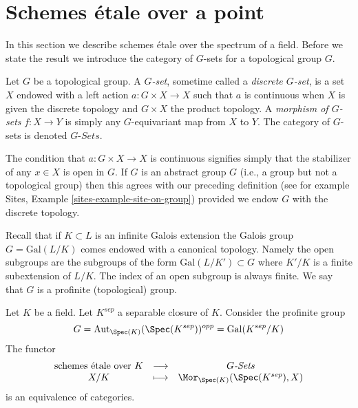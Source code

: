 \section{Schemes \'etale over a point}
\label{section-schemes-etale-point}

\noindent
In this section we describe schemes \'etale over the spectrum of
a field. Before we state the result we introduce
the category of $G$-sets for a topological group $G$.

\begin{definition}
\label{definition-G-set-continuous}
Let $G$ be a topological group.
A {\it $G$-set}, sometime called a {\it discrete $G$-set},
is a set $X$ endowed with a left action $a : G \times X \to X$
such that $a$ is continuous when $X$ is given the discrete topology and
$G \times X$ the product topology.
A {\it morphism of $G$-sets} $f : X \to Y$ is simply any $G$-equivariant
map from $X$ to $Y$.
The category of $G$-sets is denoted {\it $G\textit{-Sets}$}.
\end{definition}

\noindent
The condition that $a : G \times X \to X$ is continuous signifies
simply that the stabilizer of any  $x \in X$ is open in $G$.
If $G$ is an abstract group $G$ (i.e., a group but not a topological group)
then this agrees with our preceding definition (see for example
Sites, Example \ref{sites-example-site-on-group})
provided we endow $G$ with the discrete topology.

\medskip\noindent
Recall that if $K \subset L$ is an infinite Galois extension the
Galois group $G = \text{Gal}(L/K)$ comes endowed with a canonical
topology. Namely the open subgroups are the subgroups of the form
$\text{Gal}(L/K') \subset G$ where $K'/K$ is a finite subextension of $L/K$.
The index of an open subgroup is always finite.
We say that $G$ is a profinite (topological) group.

\begin{lemma}
\label{lemma-sheaves-point}
Let $K$ be a field.
Let $K^{sep}$ a separable closure of $K$.
Consider the profinite group
$$
G = \text{Aut}_{\Spec(K)}(\Spec(K^{sep}))^{opp} =
\text{Gal}(K^{sep}/K)
$$
The functor
$$
\begin{matrix}
\text{schemes \'etale over }K &
\longrightarrow &
G\textit{-Sets} \\
X/K & \longmapsto &
\Mor_{\Spec(K)}(\Spec(K^{sep}), X)
\end{matrix}
$$
is an equivalence of categories.
\end{lemma}

